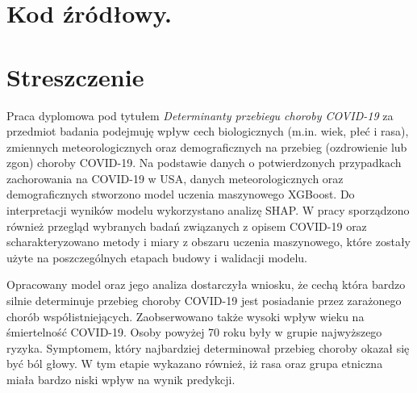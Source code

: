 \documentclass[polish, twoside, 12pt, a4paper]{article}
\theoremstyle{definition}
\theoremstyle{plain}
\theoremstyle{remark}
\begin{document}
\clearpage
\section{Kod źródłowy.}



 



\clearpage



\clearpage
{}
\listoftables

\clearpage
{}
\listoffigures



\clearpage
{}
\section*{Streszczenie}


Praca dyplomowa pod tytułem \emph{Determinanty przebiegu choroby COVID-19} za przedmiot badania podejmuję wpływ cech biologicznych (m.in. wiek, płeć i rasa), zmiennych meteorologicznych oraz demograficznych na przebieg (ozdrowienie lub zgon) choroby COVID-19. Na podstawie danych o potwierdzonych przypadkach zachorowania na COVID-19 w USA, danych meteorologicznych oraz demograficznych stworzono model uczenia maszynowego XGBoost. Do interpretacji wyników modelu wykorzystano analizę SHAP. W pracy sporządzono również przegląd wybranych badań związanych z opisem COVID-19 oraz scharakteryzowano metody i miary z obszaru uczenia maszynowego, które zostały użyte na poszczególnych etapach budowy i walidacji modelu.

Opracowany model oraz jego analiza dostarczyła wniosku, że cechą która bardzo silnie determinuje przebieg choroby COVID-19 jest posiadanie przez zarażonego chorób współistniejących. Zaobserwowano także wysoki wpływ wieku na śmiertelność COVID-19. Osoby powyżej 70 roku były w grupie najwyższego ryzyka. Symptomem, który najbardziej determinował przebieg choroby okazał się być ból głowy. W tym etapie wykazano również, iż rasa oraz grupa etniczna miała bardzo niski wpływ na wynik predykcji.
\end{document}
